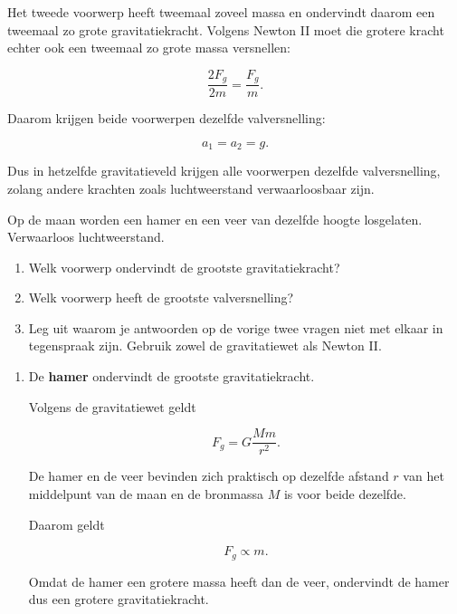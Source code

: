 \documentclass{ximera}
\begin{document}
      Het tweede voorwerp heeft tweemaal zoveel massa en ondervindt daarom
een tweemaal zo grote gravitatiekracht. Volgens Newton II moet die
grotere kracht echter ook een tweemaal zo grote massa versnellen:

\[
\frac{2F_g}{2m}
=
\frac{F_g}{m}.
\]

Daarom krijgen beide voorwerpen dezelfde valversnelling:

\[
\boxed{
a_1=a_2=g.
}
\]

Dus in hetzelfde gravitatieveld krijgen alle voorwerpen dezelfde
valversnelling, zolang andere krachten zoals luchtweerstand
verwaarloosbaar zijn.



\begin{oefening}{\oefU\ESS}

Op de maan worden een hamer en een veer van dezelfde hoogte losgelaten.
Verwaarloos luchtweerstand.

\begin{enumerate}
  \item Welk voorwerp ondervindt de grootste gravitatiekracht?
  \item Welk voorwerp heeft de grootste valversnelling?
  \item Leg uit waarom je antwoorden op de vorige twee vragen niet met
        elkaar in tegenspraak zijn. Gebruik zowel de gravitatiewet als
        Newton II.
\end{enumerate}

\begin{oplossing}

      \begin{enumerate}
      
      \item
      De \textbf{hamer} ondervindt de grootste gravitatiekracht.
      
      Volgens de gravitatiewet geldt
      
      \[
      F_g
      =
      G\frac{Mm}{r^2}.
      \]
      
      De hamer en de veer bevinden zich praktisch op dezelfde afstand $r$
      van het middelpunt van de maan en de bronmassa $M$ is voor beide
      dezelfde.
      
      Daarom geldt
      
      \[
      F_g\propto m.
      \]
      
      Omdat de hamer een grotere massa heeft dan de veer, ondervindt de
      hamer dus een grotere gravitatiekracht.
      

\end{enumerate}
\end{oplossing}
\end{oefening}
\end{document}
